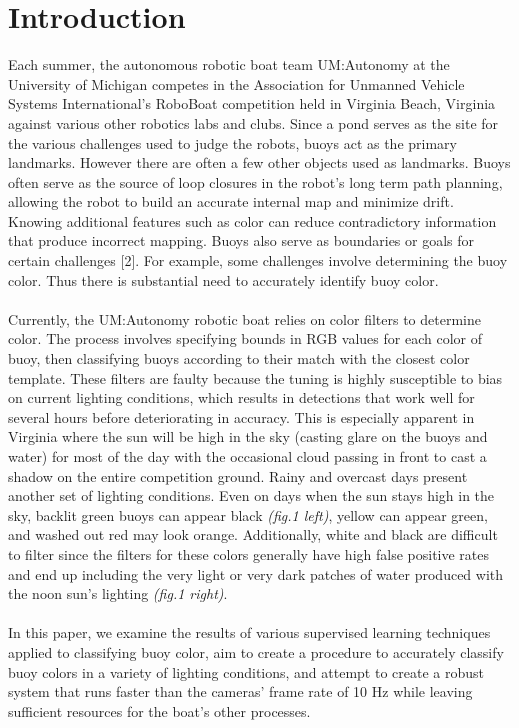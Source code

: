 \documentclass{article} %
\begin{document}
\section{Introduction}
Each summer, the autonomous robotic boat team UM:Autonomy at the University of Michigan competes in the Association for Unmanned Vehicle Systems International's RoboBoat competition held in Virginia Beach, Virginia against various other robotics labs and clubs. Since a pond serves as the site for the various challenges used to judge the robots, buoys act as the primary landmarks. However there are often a few other objects used as landmarks. Buoys often serve as the source of loop closures in the robot's long term path planning, allowing the robot to build an accurate internal map and minimize drift. Knowing additional features such as color can reduce contradictory information that produce incorrect mapping. Buoys also serve as boundaries or goals for certain challenges [2]. For example, some challenges involve determining the buoy color. Thus there is substantial need to accurately identify buoy color.
\\\\Currently, the UM:Autonomy robotic boat relies on color filters to determine color. The process involves specifying bounds in RGB values for each color of buoy, then classifying buoys according to their match with the closest color template. These filters are faulty because the tuning is highly susceptible to bias on current lighting conditions, which results in detections that work well for several hours before deteriorating in accuracy. This is especially apparent in Virginia where the sun will be high in the sky (casting glare on the buoys and water) for most of the day with the occasional cloud passing in front to cast a shadow on the entire competition ground. Rainy and overcast days present another set of lighting conditions. Even on days when the sun stays high in the sky, backlit green buoys can appear black \textit{(fig.1 left)}, yellow can appear green, and washed out red may look orange. Additionally, white and black are difficult to filter since the filters for these colors generally have high false positive rates and end up including the very light or very dark patches of water produced with the 
noon sun's lighting \textit{(fig.1 right)}.
\\\\In this paper, we examine the results of various supervised learning techniques applied to classifying buoy color, aim to create a procedure to accurately classify buoy colors in a variety of lighting conditions, and attempt to create a robust system that runs faster than the cameras' frame rate of 10 Hz while leaving sufficient resources for the boat's other processes.
\end{document}
